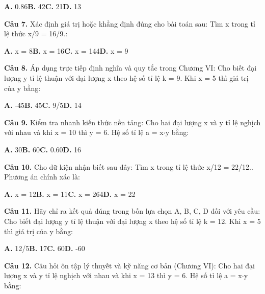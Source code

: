 \documentclass[11pt,a4paper]{article}
\begin{document}
\hspace*{1.5em}\textbf{A.} 0.86\quad\quad \textbf{B.} 42\quad\quad \textbf{C.} 21\quad\quad \textbf{D.} 13\par\vspace{2pt}
\textbf{\color{primary} Câu 7.} Xác định giá trị hoặc khẳng định đúng cho bài toán sau: Tìm x trong tỉ lệ thức x/9 = 16/9.:\par
\hspace*{1.5em}\textbf{A.} x = 8\quad\quad \textbf{B.} x = 16\quad\quad \textbf{C.} x = 144\quad\quad \textbf{D.} x = 9\par\vspace{2pt}
\textbf{\color{primary} Câu 8.} Áp dụng trực tiếp định nghĩa và quy tắc trong Chương VI: Cho biết đại lượng y tỉ lệ thuận với đại lượng x theo hệ số tỉ lệ k = 9. Khi x = 5 thì giá trị của y bằng:\par
\hspace*{1.5em}\textbf{A.} -45\quad\quad \textbf{B.} 45\quad\quad \textbf{C.} 9/5\quad\quad \textbf{D.} 14\par\vspace{2pt}
\textbf{\color{primary} Câu 9.} Kiểm tra nhanh kiến thức nền tảng: Cho hai đại lượng x và y tỉ lệ nghịch với nhau và khi x = 10 thì y = 6. Hệ số tỉ lệ a = x$\cdot$y bằng:\par
\hspace*{1.5em}\textbf{A.} 30\quad\quad \textbf{B.} 60\quad\quad \textbf{C.} 0.60\quad\quad \textbf{D.} 16\par\vspace{2pt}
\textbf{\color{primary} Câu 10.} Cho dữ kiện nhận biết sau đây: Tìm x trong tỉ lệ thức x/12 = 22/12.. Phương án chính xác là:\par
\hspace*{1.5em}\textbf{A.} x = 12\quad\quad \textbf{B.} x = 11\quad\quad \textbf{C.} x = 264\quad\quad \textbf{D.} x = 22\par\vspace{2pt}
\textbf{\color{primary} Câu 11.} Hãy chỉ ra kết quả đúng trong bốn lựa chọn A, B, C, D đối với yêu cầu: Cho biết đại lượng y tỉ lệ thuận với đại lượng x theo hệ số tỉ lệ k = 12. Khi x = 5 thì giá trị của y bằng:\par
\hspace*{1.5em}\textbf{A.} 12/5\quad\quad \textbf{B.} 17\quad\quad \textbf{C.} 60\quad\quad \textbf{D.} -60\par\vspace{2pt}
\textbf{\color{primary} Câu 12.} Câu hỏi ôn tập lý thuyết và kỹ năng cơ bản (Chương VI): Cho hai đại lượng x và y tỉ lệ nghịch với nhau và khi x = 13 thì y = 6. Hệ số tỉ lệ a = x$\cdot$y bằng:\par
\end{document}

